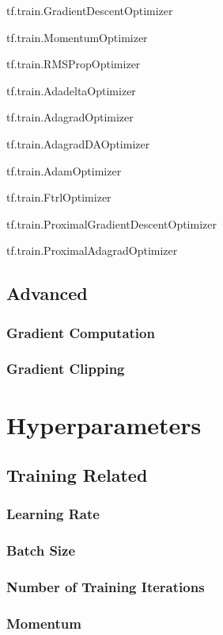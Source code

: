 tf.train.GradientDescentOptimizer

tf.train.MomentumOptimizer

tf.train.RMSPropOptimizer

tf.train.AdadeltaOptimizer

tf.train.AdagradOptimizer

tf.train.AdagradDAOptimizer

tf.train.AdamOptimizer

tf.train.FtrlOptimizer

tf.train.ProximalGradientDescentOptimizer

tf.train.ProximalAdagradOptimizer

\subsection{Advanced}

\subsubsection{Gradient Computation}

\subsubsection{Gradient Clipping}


\section{Hyperparameters}

\subsection{Training Related}

\subsubsection{Learning Rate}

\subsubsection{Batch Size}

\subsubsection{Number of Training Iterations}

\subsubsection{Momentum}

